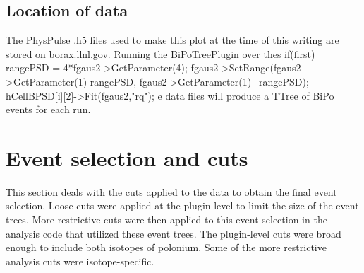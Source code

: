 \subsection{Location of data}
The PhysPulse .h5 files used to make this plot at the time of this writing are stored on borax.llnl.gov. Running the BiPoTreePlugin over thes	if(first){
	rangePSD = 4*fgaus2->GetParameter(4);
	fgaus2->SetRange(fgaus2->GetParameter(1)-rangePSD,
	fgaus2->GetParameter(1)+rangePSD);
	hCellBPSD[i][2]->Fit(fgaus2,"rq");
}
e data files will produce a TTree of BiPo events for each run. 

\section{Event selection and cuts\label{sec:cuts}}
This section deals with the cuts applied to the data to obtain the final event selection. Loose cuts were applied at the plugin-level to limit the size of the event trees. More restrictive cuts were then applied to this event selection in the analysis code that utilized these event trees. The plugin-level cuts were broad enough to include both isotopes of polonium. Some of the more restrictive analysis cuts were isotope-specific.
